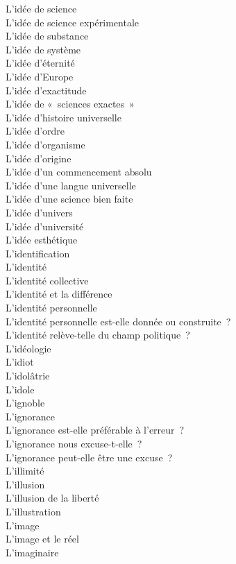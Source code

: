 \documentclass[a4paper,12pt]{article}
\begin{document}
L'idée de science \\
L'idée de science expérimentale \\
L'idée de substance \\
L'idée de système \\
L'idée d'éternité \\
L'idée d'Europe \\
L'idée d'exactitude \\
L'idée de « sciences exactes » \\
L'idée d'histoire universelle \\
L'idée d'ordre \\
L'idée d'organisme \\
L'idée d'origine \\
L'idée d'un commencement absolu \\
L'idée d'une langue universelle \\
L'idée d'une science bien faite \\
L'idée d'univers \\
L'idée d'université \\
L'idée esthétique \\
L'identification \\
L'identité \\
L'identité collective \\
L'identité et la différence \\
L'identité personnelle \\
L'identité personnelle est-elle donnée ou construite ? \\
L'identité relève-telle du champ politique ? \\
L'idéologie \\
L'idiot \\
L'idolâtrie \\
L'idole \\
L'ignoble \\
L'ignorance \\
L'ignorance est-elle préférable à l'erreur ? \\
L'ignorance nous excuse-t-elle ? \\
L'ignorance peut-elle être une excuse ? \\
L'illimité \\
L'illusion \\
L'illusion de la liberté \\
L'illustration \\
L'image \\
L'image et le réel \\
L'imaginaire \\
\end{document}
